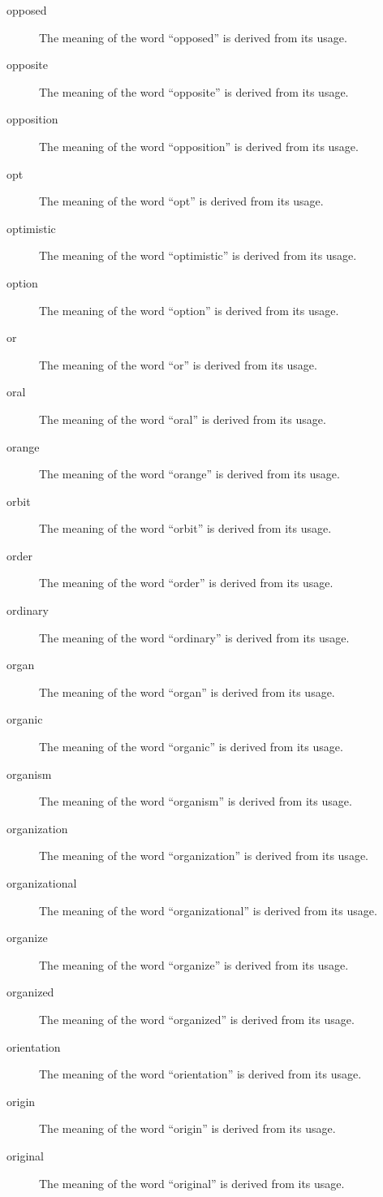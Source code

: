 \documentclass[12pt, letterpaper]{memoir}
\begin{document}
\begin{description}
\item[opposed] The meaning of the word ``opposed'' is derived from its usage.
\item[opposite] The meaning of the word ``opposite'' is derived from its usage.
\item[opposition] The meaning of the word ``opposition'' is derived from its usage.
\item[opt] The meaning of the word ``opt'' is derived from its usage.
\item[optimistic] The meaning of the word ``optimistic'' is derived from its usage.
\item[option] The meaning of the word ``option'' is derived from its usage.
\item[or] The meaning of the word ``or'' is derived from its usage.
\item[oral] The meaning of the word ``oral'' is derived from its usage.
\item[orange] The meaning of the word ``orange'' is derived from its usage.
\item[orbit] The meaning of the word ``orbit'' is derived from its usage.
\item[order] The meaning of the word ``order'' is derived from its usage.
\item[ordinary] The meaning of the word ``ordinary'' is derived from its usage.
\item[organ] The meaning of the word ``organ'' is derived from its usage.
\item[organic] The meaning of the word ``organic'' is derived from its usage.
\item[organism] The meaning of the word ``organism'' is derived from its usage.
\item[organization] The meaning of the word ``organization'' is derived from its usage.
\item[organizational] The meaning of the word ``organizational'' is derived from its usage.
\item[organize] The meaning of the word ``organize'' is derived from its usage.
\item[organized] The meaning of the word ``organized'' is derived from its usage.
\item[orientation] The meaning of the word ``orientation'' is derived from its usage.
\item[origin] The meaning of the word ``origin'' is derived from its usage.
\item[original] The meaning of the word ``original'' is derived from its usage.

\end{description}
\end{document}
